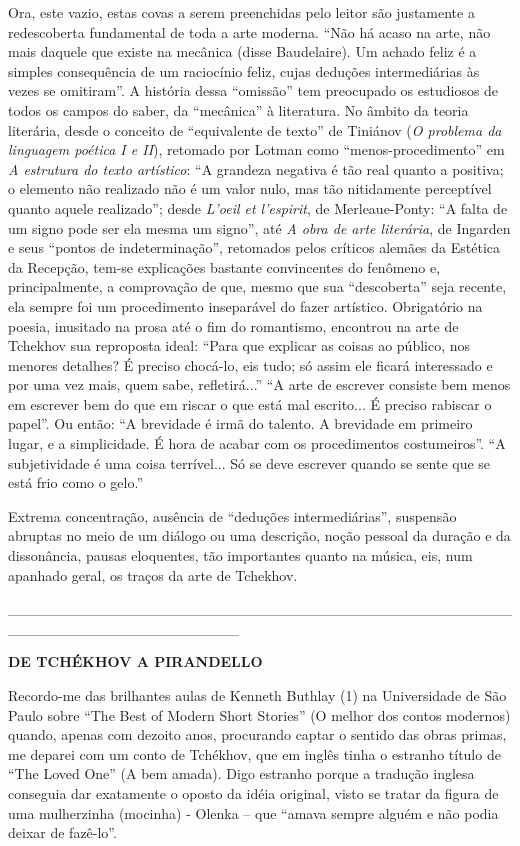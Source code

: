 Ora, este vazio, estas covas a serem preenchidas pelo leitor são
justamente a redescoberta fundamental de toda a arte moderna. ``Não há
acaso na arte, não mais daquele que existe na mecânica (disse
Baudelaire). Um achado feliz é a simples consequência de um raciocínio
feliz, cujas deduções intermediárias às vezes se omitiram''. A história
dessa ``omissão'' tem preocupado os estudiosos de todos os campos do
saber, da ``mecânica'' à literatura. No âmbito da teoria literária,
desde o conceito de ``equivalente de texto'' de Tiniánov (\emph{O
problema da linguagem poética I e II}), retomado por Lotman como
``menos-procedimento'' em \emph{A estrutura do texto artístico}: ``A
grandeza negativa é tão real quanto a positiva; o elemento não realizado
não é um valor nulo, mas tão nitidamente perceptível quanto aquele
realizado''; desde \emph{L'oeil et l'espirit}, de Merleaue-Ponty: ``A
falta de um signo pode ser ela mesma um signo'', até \emph{A obra de
arte literária}, de Ingarden e seus ``pontos de indeterminação'',
retomados pelos críticos alemães da Estética da Recepção, tem-se
explicações bastante convincentes do fenômeno e, principalmente, a
comprovação de que, mesmo que sua ``descoberta'' seja recente, ela
sempre foi um procedimento inseparável do fazer artístico. Obrigatório
na poesia, inusitado na prosa até o fim do romantismo, encontrou na arte
de Tchekhov sua reproposta ideal: ``Para que explicar as coisas ao
público, nos menores detalhes? É preciso chocá-lo, eis tudo; só assim
ele ficará interessado e por uma vez mais, quem sabe, refletirá...'' ``A
arte de escrever consiste bem menos em escrever bem do que em riscar o
que está mal escrito... É preciso rabiscar o papel''. Ou então: ``A
brevidade é irmã do talento. A brevidade em primeiro lugar, e a
simplicidade. É hora de acabar com os procedimentos costumeiros''. ``A
subjetividade é uma coisa terrível... Só se deve escrever quando se
sente que se está frio como o gelo.''

Extrema concentração, ausência de ``deduções intermediárias'', suspensão
abruptas no meio de um diálogo ou uma descrição, noção pessoal da
duração e da dissonância, pausas eloquentes, tão importantes quanto na
música, eis, num apanhado geral, os traços da arte de Tchekhov.

\_\_\_\_\_\_\_\_\_\_\_\_\_\_\_\_\_\_\_\_\_\_\_\_\_\_\_\_\_\_\_\_\_\_\_\_\_\_\_\_\_\_\_\_\_\_\_\_\_\_\_\_\_\_\_\_\_\_\_\_\_\_\_\_\_\_\_\_\_\_

\textbf{DE TCHÉKHOV A PIRANDELLO}

Recordo-me das brilhantes aulas de Kenneth Buthlay (1) na Universidade
de São Paulo sobre ``The Best of Modern Short Stories'' (O melhor dos
contos modernos) quando, apenas com dezoito anos, procurando captar o
sentido das obras primas, me deparei com um conto de Tchékhov, que em
inglês tinha o estranho título de ``The Loved One'' (A bem amada). Digo
estranho porque a tradução inglesa conseguia dar exatamente o oposto da
idéia original, visto se tratar da figura de uma mulherzinha (mocinha) -
Olenka -- que ``amava sempre alguém e não podia deixar de fazê-lo''.

